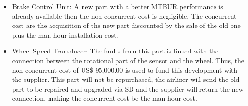 \begin{itemize}
\item	Brake Control Unit: A new part with a better MTBUR performance is already available then the non-concurrent cost is negligible. The concurrent cost are the acquisition of the new part discounted by the sale of the old one plus the man-hour installation cost.
\item	Wheel Speed Transducer: The faults from this part is linked with the connection between the rotational part of the sensor and the wheel. Thus, the non-concurrent cost of US\$ 95,000.00 is used to fund this development with the supplier. This part will not be repurchased, the airliner will send the old part to be repaired and upgraded via SB and the supplier will return the new connection, making the concurrent cost be the man-hour cost.
\end{itemize}


\begin{figure}[H] %
\label{fig:HidroCostSum1}
\end{figure}

\begin{figure}[H] %
\label{fig:HidroCostSum2}
\end{figure}

